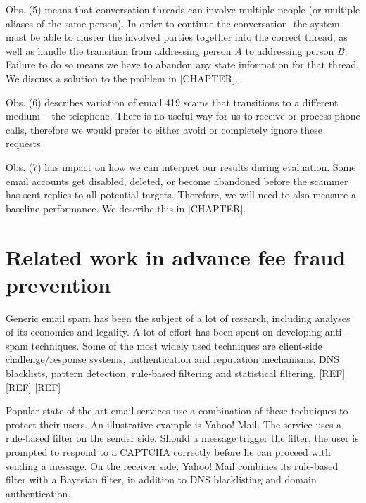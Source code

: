 Obs. (5) means that conversation threads can involve multiple people (or multiple aliases of the same person). In order to continue the conversation, the system must be able to cluster the involved parties together into the correct thread, as well as handle the transition from addressing person $A$ to addressing person $B$. Failure to do so means we have to abandon any state information for that thread. We discuss a solution to the problem in [CHAPTER].

Obs. (6) describes variation of email 419 scams that transitions to a different medium -- the telephone. There is no useful way for us to receive or process phone calls, therefore we would prefer to either avoid or completely ignore these requests.

Obs. (7) has impact on how we can interpret our results during evaluation. Some email accounts get disabled, deleted, or become abandoned before the scammer has sent replies to all potential targets. Therefore, we will need to also measure a baseline performance. We describe this in [CHAPTER].

\section{Related work in advance fee fraud prevention}
Generic email spam has been the subject of a lot of research, including analyses of its economics and legality. A lot of effort has been spent on developing anti-spam techniques. Some of the most widely used techniques are client-side challenge/response systems, authentication and reputation mechanisms, DNS blacklists, pattern detection, rule-based filtering and statistical filtering. [REF] [REF] [REF]

Popular state of the art email services use a combination of these techniques to protect their users. An illustrative example is Yahoo! Mail. The service uses a rule-based filter on the sender side. Should a message trigger the filter, the user is prompted to respond to a CAPTCHA correctly before he can proceed with sending a message. On the receiver side, Yahoo! Mail combines its rule-based filter with a Bayesian filter, in addition to DNS blacklisting and domain authentication. 

